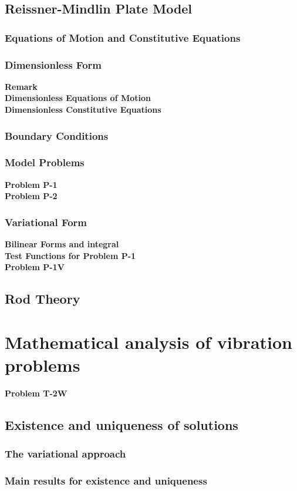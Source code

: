 \documentclass[../main.tex]{subfiles}
\begin{document}
\subsection{Reissner-Mindlin Plate Model}
\subsubsection{Equations of Motion and Constitutive Equations}
\subsubsection{Dimensionless Form}
\textbf{Remark}\\
\textbf{Dimensionless Equations of Motion}\\
\textbf{Dimensionless Constitutive Equations}
\subsubsection{Boundary Conditions}
\subsubsection{Model Problems}
\textbf{Problem P-1}\\
\textbf{Problem P-2}
\subsubsection{Variational Form}
\textbf{Bilinear Forms and integral}\\
\textbf{Test Functions for Problem P-1}\\
\textbf{Problem P-1V}
\subsection{Rod Theory}
\section{Mathematical analysis of vibration problems}
\textbf{Problem T-2W}
\subsection{Existence and uniqueness of solutions}
\subsubsection{The variational approach}
\subsubsection{Main results for existence and uniqueness}
\end{document}
